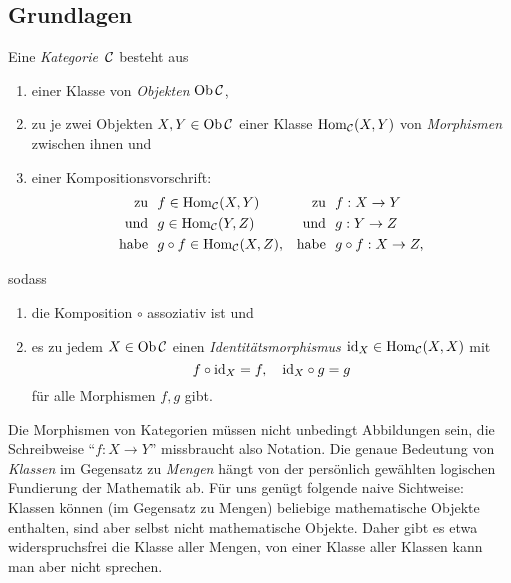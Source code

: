 \subsection{Grundlagen}

\begin{defn}
Eine \emph{Kategorie}~$\mathcal{C}$ besteht aus
\begin{enumerate}
  \item einer Klasse von \emph{Objekten} $\operatorname{Ob} \mathcal{C}$,
  \item zu je zwei Objekten $X,Y \in \operatorname{Ob} \mathcal{C}$ einer Klasse $\mathrm{Hom}_{\mathcal{C}}(X,Y)$ von
  \emph{Morphismen} zwischen ihnen und
  \item einer Kompositionsvorschrift:
  \begin{align*}
    \text{zu }\ & f \in \mathrm{Hom}_{\mathcal{C}}(X,Y) &
    \text{zu }\ & f : X \to Y \\
    \text{und }\ & g\in\mathrm{Hom}_{\mathcal{C}}(Y,Z) &
    \text{und }\ & g : Y \to Z \\
    \text{habe }\ & g\circ f\in\mathrm{Hom}_{\mathcal{C}}(X,Z), &
    \text{habe }\ & g\circ f : X \to Z,
  \end{align*}
\end{enumerate}
sodass
\begin{enumerate}
  \item die Komposition $\circ$ assoziativ ist und
  \item es zu jedem $X \in \operatorname{Ob}\mathcal{C}$ einen \emph{Identitätsmorphismus} $\mathrm{id}_X
  \in \mathrm{Hom}_{\mathcal{C}}(X,X)$ mit
  \[ f \circ \mathrm{id}_X = f, \quad \mathrm{id}_X \circ g = g \]
  für alle Morphismen $f,g$ gibt.
\end{enumerate}
\end{defn}

Die Morphismen von Kategorien müssen nicht unbedingt Abbildungen
sein, die Schreibweise "`$f:X \to Y$"' missbraucht also Notation. Die genaue
Bedeutung von \emph{Klassen} im Gegensatz zu \emph{Mengen} hängt von der
persönlich gewählten logischen Fundierung der Mathematik ab. Für uns genügt
folgende naive Sichtweise: Klassen können (im Gegensatz zu Mengen) beliebige
mathematische Objekte enthalten, sind aber selbst nicht mathematische Objekte.
Daher gibt es etwa widerspruchsfrei die Klasse aller Mengen, von einer Klasse
aller Klassen kann man aber nicht sprechen.

